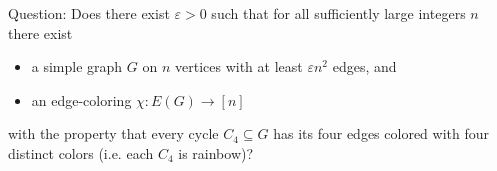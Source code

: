 Question: Does there exist $\varepsilon>0$ such that for all sufficiently large integers $n$ there exist
\begin{itemize}
\item a simple graph $G$ on $n$ vertices with at least $\varepsilon n^2$ edges, and
\item an edge-coloring $\chi:E(G)\to [n]$
\end{itemize}
with the property that every cycle $C_4\subseteq G$ has its four edges colored with four distinct colors (i.e. each $C_4$ is rainbow)?
